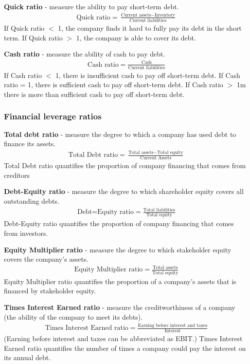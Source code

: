\textbf{Quick ratio} - measure the ability to pay short-term debt.
\begin{gather}
    \textrm{Quick ratio} = \frac{\textrm{Current assets}-\textrm{Inventory}}{\textrm{Current liabilities}}
\end{gather}
If Quick ratio $<$ 1, the company finds it hard to fully pay its debt in the short term. If Quick ratio $>$ 1, the company is able to cover its debt.

\textbf{Cash ratio} - measure the ability of cash to pay debt.
\begin{gather}
    \textrm{Cash ratio} = \frac{\textrm{Cash}}{\textrm{Current liabilities}}
\end{gather}
If Cash ratio $<$ 1, there is insufficient cash to pay off short-term debt. If Cash ratio = 1, there is sufficient cash to pay off short-term debt. If Cash ratio $>$ 1m there is more than sufficient cash to pay off short-term debt.
\subsubsection{Financial leverage ratios}
\textbf{Total debt ratio} - measure the degree to which a company has used debt to finance its assets.
\begin{gather}
    \textrm{Total Debt ratio} = \frac{\textrm{Total assets} - \textrm{Total equity}}{\textrm{Current Assets}}
\end{gather}
Total Debt ratio quantifies the proportion of company financing that comes from creditors

\textbf{Debt-Equity ratio} - measure the degree to which shareholder equity covers all outstanding debts.
\begin{gather}
    \textrm{Debt=Equity ratio} = \frac{\textrm{Total liabilities}}{\textrm{Total equity}}
\end{gather}
Debt-Equity ratio quantifies the proportion of company financing that comes from investors.

\textbf{Equity Multiplier ratio} - measure the degree to which stakeholder equity covers the company's assets.
\begin{gather}
    \textrm{Equity Multiplier ratio} = \frac{\textrm{Total assets}}{\textrm{Total equity}}
\end{gather}
Equity Multiplier ratio quantifies the proportion of a company's assets that is financed by stakeholder equity.

\textbf{Times Interest Earned ratio} - measure the creditworthiness of a company (the ability of the company to meet its debts).
\begin{gather}
    \textrm{Times Interest Earned ratio} = \frac{\textrm{Earning before interest and taxes}}{\textrm{Interest}}
\end{gather}
(Earning before interest and taxes can be abbreviated as EBIT.) Times Interest Earned ratio quantifies the number of times a company could pay the interest on its annual debt.

